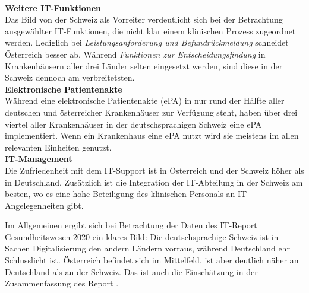 \vspace{\parheadvspace}\\
\textbf{Weitere IT-Funktionen}\\
Das Bild von der Schweiz als Vorreiter verdeutlicht sich bei der Betrachtung ausgewählter IT-Funktionen, die nicht klar einem klinischen Prozess zugeordnet werden. Lediglich bei \textit{Leistungsanforderung und Befundrückmeldung} schneidet Österreich besser ab. Während \textit{Funktionen zur Entscheidungsfindung} in Krankenhäusern aller drei Länder selten eingesetzt werden, sind diese in der Schweiz dennoch am verbreitetsten.
\vspace{\parheadvspace}\\
\textbf{Elektronische Patientenakte}\\
Während eine elektronische Patientenakte (ePA) in nur rund der Hälfte aller deutschen und österreicher Krankenhäuser zur Verfügung steht, haben über drei viertel aller Krankenhäuser in der deutschsprachigen Schweiz eine ePA implementiert. Wenn ein Krankenhaus eine ePA nutzt wird sie meistens im allen relevanten Einheiten genutzt.
\vspace{\parheadvspace}\\
\textbf{IT-Management}\\
Die Zufriedenheit mit dem IT-Support ist in Österreich und der Schweiz höher als in Deutschland. Zusätzlich ist die Integration der IT-Abteilung in der Schweiz am besten, wo es eine hohe Beteiligung des klinischen Personals an IT-Angelegenheiten gibt.

Im Allgemeinen ergibt sich bei Betrachtung der Daten des IT-Report Gesundheitswesen 2020 ein klares Bild: Die deutschsprachige Schweiz ist in Sachen Digitalisierung den andern Ländern vorraus, während Deutschland ehr Schlusslicht ist. Österreich befindet sich im Mittelfeld, ist aber deutlich näher an Deutschland als an der Schweiz. Das ist auch die Einschätzung in der Zusammenfassung des Report \parencite[29]{huebner2020}.

